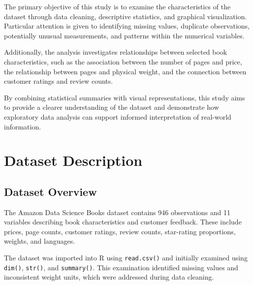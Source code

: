 \documentclass[11pt,a4paper]{article}
\begin{document}
The primary objective of this study is to examine the characteristics of the dataset through data cleaning, descriptive statistics, and graphical visualization. Particular attention is given to identifying missing values, duplicate observations, potentially unusual measurements, and patterns within the numerical variables.

Additionally, the analysis investigates relationships between selected book characteristics, such as the association between the number of pages and price, the relationship between pages and physical weight, and the connection between customer ratings and review counts.

By combining statistical summaries with visual representations, this study aims to provide a clearer understanding of the dataset and demonstrate how exploratory data analysis can support informed interpretation of real-world information.
\newpage
\section{Dataset Description}
\begingroup
\setlength{\parskip}{3pt}
\renewcommand{\arraystretch}{0.9}
\subsection{Dataset Overview}
The Amazon Data Science Books dataset contains 946 observations
and 11 variables describing book characteristics and customer
feedback. These include prices, page counts, customer ratings,
review counts, star-rating proportions, weights, and languages.

The dataset was imported into R using \texttt{read.csv()}
and initially examined using \texttt{dim()}, \texttt{str()},
and \texttt{summary()}. This examination identified missing
values and inconsistent weight units, which were addressed
during data cleaning.
\end{document}
